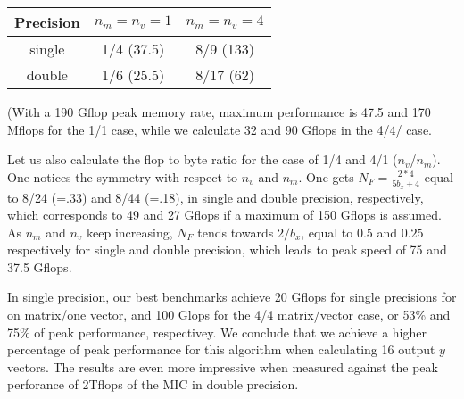 \begin{center}
\begin{tabular}{|c|c|c|}
\hline
Precision & $n_m=n_v=1$ & $n_m=n_v=4$     \\
\hline
single    &  1/4  (37.5)     &   8/9 (133) \\
double    &  1/6  (25.5)     &   8/17 (62) \\
\hline
\end{tabular}
\end{center}
(With a 190 Gflop peak memory rate, maximum performance is 47.5 and 170 Mflops for the 1/1 case, while we calculate 32 and 90 Gflops in the 4/4/ case. 

Let us also calculate the flop to byte ratio for the case of 1/4 and 4/1 ($n_v$/$n_m$). One notices the symmetry with respect to $n_v$ and $n_m$. 
One gets $N_F = \frac{2*4}{5 b_x + 4}$ equal to 8/24 (=.33) and 8/44 (=.18), in single and double precision, respectively, which corresponds to 49 and 27 Gflops if a maximum of 150 Gflops is assumed.
As $n_m$ and $n_v$ keep increasing, $N_F$ tends towards $2/b_x$, equal to $0.5$ and $0.25$ respectively for single and double precision, which leads to peak speed of 75 and 37.5 Gflops.

In single precision, our best benchmarks achieve 20 Gflops for single precisions for on matrix/one vector, and 100 Glops for the 4/4 matrix/vector case, or 53\% and 75\% of peak performance, respectivey. We conclude that we achieve a higher percentage of peak performance for this algorithm when calculating 16 output $y$ vectors. The results are even more impressive when measured against the peak perforance of 2Tflops of the MIC in double precision.
